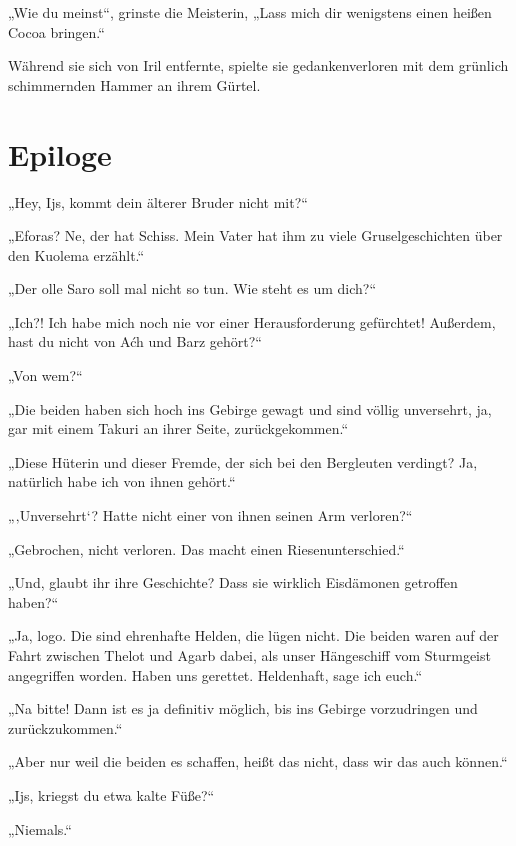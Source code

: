 „Wie du meinst“, grinste die Meisterin, „Lass mich dir wenigstens einen heißen Cocoa bringen.“

Während sie sich von Iril entfernte, spielte sie gedankenverloren mit dem grünlich schimmernden Hammer an ihrem Gürtel.






\newpage
\section{Epiloge}


„Hey, Ijs, kommt dein älterer Bruder nicht mit?“

„Eforas? Ne, der hat Schiss. Mein Vater hat ihm zu viele Gruselgeschichten über den Kuolema erzählt.“

„Der olle Saro soll mal nicht so tun. Wie steht es um dich?“

„Ich?! Ich habe mich noch nie vor einer Herausforderung gefürchtet! Außerdem, hast du nicht von Aćh und Barz gehört?“

„Von wem?“

„Die beiden haben sich hoch ins Gebirge gewagt und sind völlig unversehrt, ja, gar mit einem Takuri an ihrer Seite, zurückgekommen.“

„Diese Hüterin und dieser Fremde, der sich bei den Bergleuten verdingt? Ja, natürlich habe ich von ihnen gehört.“

„‚Unversehrt‘? Hatte nicht einer von ihnen seinen Arm verloren?“

„Gebrochen, nicht verloren. Das macht einen Riesenunterschied.“

„Und, glaubt ihr ihre Geschichte? Dass sie wirklich Eisdämonen getroffen haben?“

„Ja, logo. Die sind ehrenhafte Helden, die lügen nicht. Die beiden waren auf der Fahrt zwischen Thelot und Agarb dabei, als unser Hängeschiff vom Sturmgeist angegriffen worden. Haben uns gerettet. Heldenhaft, sage ich euch.“

„Na bitte! Dann ist es ja definitiv möglich, bis ins Gebirge vorzudringen und zurückzukommen.“

„Aber nur weil die beiden es schaffen, heißt das nicht, dass wir das auch können.“

„Ijs, kriegst du etwa kalte Füße?“

„Niemals.“\bigskip







